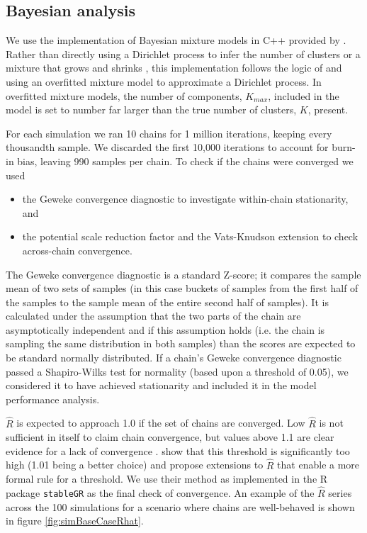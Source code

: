 \documentclass[]{article}
\begin{document}
\subsection{Bayesian analysis} \label{sec:simBayesianAnalysis}
We use the implementation of Bayesian mixture models in C++ provided by \cite{mason2016mdi}. Rather than directly using a Dirichlet process \citep{ferguson1973bayesian} to infer the number of clusters or a mixture that grows and shrinks \citep[][]{richardson1997bayesian}, this implementation follows the logic of \cite{rousseau2011asymptotic} and \cite{van2015overfitting} using an overfitted mixture model to approximate a Dirichlet process. In overfitted mixture models, the number of components, $K_{max}$, included in the model is set to number far larger than the true number of clusters, $K$, present. 

For each simulation we ran 10 chains for 1 million iterations, keeping every thousandth sample. We discarded the first 10,000 iterations to account for burn-in bias, leaving 990 samples per chain. To check if the chains were converged we used
\begin{itemize}
	\item the Geweke convergence diagnostic \citep{geweke1991evaluating} to investigate within-chain stationarity, and
	\item the potential scale reduction factor \citep[$\hat{R}$, ][]{gelman1992inference} and the Vats-Knudson extension \citep[\emph{stable $\hat{R}$},][]{vats2018revisiting} to check across-chain convergence.
\end{itemize}
The Geweke convergence diagnostic is a standard Z-score; it compares the sample mean of two sets of samples (in this case buckets of samples from the first half of the samples to the sample mean of the entire second half of samples). It is calculated under the assumption that the two parts of the chain are asymptotically independent and if this assumption holds (i.e. the chain is sampling the same distribution in both samples) than the scores are expected to be standard normally distributed. If a chain's Geweke convergence diagnostic passed a Shapiro-Wilks test for normality \citep{shapiro1965analysis} (based upon a threshold of 0.05), we considered it to have achieved stationarity and included it in the model performance analysis. 

$\hat{R}$ is expected to approach 1.0 if the set of chains are converged. Low $\hat{R}$ is not sufficient in itself to claim chain convergence, but values above 1.1 are clear evidence for a lack of convergence \citep{gelman2013bayesian}. \cite{vats2018revisiting} show that this threshold is significantly too high (1.01 being a better choice) and propose extensions to $\hat{R}$ that enable a more formal rule for a threshold. We use their method as implemented in the R package \texttt{stableGR} \citep{knudson20202stableGR} as the final check of convergence. An example of the $\hat{R}$ series across the 100 simulations for a scenario where chains are well-behaved is shown in figure \ref{fig:simBaseCaseRhat}.
\end{document}
